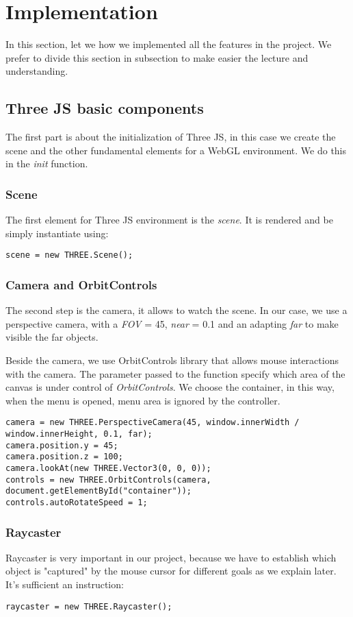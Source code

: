 \documentclass{article}
\begin{document}
\newpage
\section{Implementation}
In this section, let we how we implemented all the features in the project. We prefer to divide this section in subsection to make easier the lecture and understanding.

\subsection{Three JS basic components}
The first part is about the initialization of Three JS, in this case we create the scene and the other fundamental elements for a WebGL environment. We do this in the \textit{init} function.
\subsubsection{Scene}
The first element for Three JS environment is the \textit{scene}\cite{documentation:threejs}. It is rendered and be simply instantiate using:
\begin{lstlisting}
scene = new THREE.Scene();
\end{lstlisting}
\subsubsection{Camera and OrbitControls}
The second step is the camera, it allows to watch the scene. In our case, we use a perspective camera, with a \textit{FOV} = 45\degree, \textit{near} = 0.1 and an adapting \textit{far} to make visible the far objects\cite{documentation:threejs}.
\par Beside the camera, we use OrbitControls library that allows mouse interactions with the camera. The parameter passed to the function specify which area of the canvas is under control of \textit{OrbitControls}. We choose the container, in this way, when the menu is opened, menu area is ignored by the controller\cite{documentation:threejs}.
\begin{lstlisting}
camera = new THREE.PerspectiveCamera(45, window.innerWidth / window.innerHeight, 0.1, far);
camera.position.y = 45;
camera.position.z = 100;
camera.lookAt(new THREE.Vector3(0, 0, 0));
controls = new THREE.OrbitControls(camera, document.getElementById("container"));
controls.autoRotateSpeed = 1;
\end{lstlisting}
\subsubsection{Raycaster}
Raycaster is very important in our project, because we have to establish which object is "captured" by the mouse cursor for different goals as we explain later\cite{documentation:threejs}. It's sufficient an instruction:
\begin{lstlisting}
raycaster = new THREE.Raycaster();
\end{lstlisting}
\end{document}
